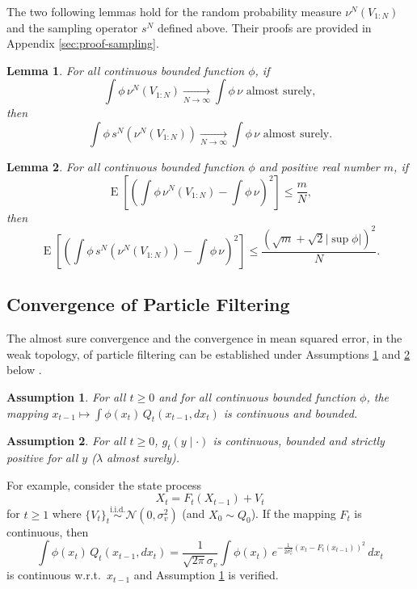 \documentclass{article}
\newtheorem{lem}{Lemma}
\newtheorem{assu}{Assumption}
\newcommand{\simiid}{\overset{\text{i.i.d.}}{\sim}}
\newcommand{\limN}{\underset{N \rightarrow \infty}{\longrightarrow}}
\DeclareMathOperator{\E}{E}
\begin{document}
The two following lemmas hold for the random probability measure $\nu^N(V_{1:N})$ and the sampling operator $s^N$ defined above. Their proofs are provided in Appendix \ref{sec:proof-sampling}.

\begin{lem} \label{lem:cv_sampling}
    For all continuous bounded function $\phi$, if
    $$\int \phi \, \nu^N(V_{1:N}) \limN \int \phi \, \nu \text{\ \ almost surely},$$
    then
    $$\int \phi \, s^N(\nu^N(V_{1:N})) \limN \int \phi \, \nu \text{\ \ almost surely.}$$
\end{lem}

\begin{lem} \label{lem:cv_sampling_l2}
    For all continuous bounded function $\phi$ and positive real number $m$, if
    $$\E[(\int \phi \, \nu^N(V_{1:N}) - \int \phi \, \nu)^2] \leq \frac{m}{N},$$
    then
    $$\E[(\int \phi \, s^N(\nu^N(V_{1:N})) - \int \phi \, \nu)^2] \leq \frac{(\sqrt{m} + \sqrt 2 |\sup \phi|)^2}{N}.$$
\end{lem}

\subsection{Convergence of Particle Filtering}

The almost sure convergence and the convergence in mean squared error, in the weak topology, of particle filtering can be established under Assumptions \ref{assu:feller} and \ref{assu:g_bounded} below \cite{Crisan2002}.

\begin{assu}\label{assu:feller}
  For all $t \geq 0$ and for all continuous bounded function $\phi$, the mapping $\displaystyle x_{t-1} \longmapsto \int \phi(x_t) \, Q_t(x_{t-1},dx_t)$ is continuous and bounded.
\end{assu}

\begin{assu}\label{assu:g_bounded}
  For all $t \geq 0$, $g_t(y \mid \cdot)$ is continuous, bounded and strictly positive for all $y$ ($\lambda$ almost surely).
\end{assu}

For example, consider the state process
\begin{equation*}
    X_t = F_t(X_{t-1}) + V_t
\end{equation*}
for $t \geq 1$ where $\{V_t\}_t \simiid \mathcal N(0,\sigma_v^2)$ (and $X_0 \sim Q_0$). If the mapping $F_t$ is continuous, then
\begin{equation*}
    \int \phi(x_t) \, Q_t(x_{t-1},dx_t) = \frac{1}{\sqrt{2\pi} \sigma_v} \int \phi(x_t) \, e^{-\frac{1}{2\sigma_v^2}(x_t-F_t(x_{t-1}))^2} \, dx_t
\end{equation*}
is continuous w.r.t.\ $x_{t-1}$ and Assumption \ref{assu:feller} is verified.
\end{document}
